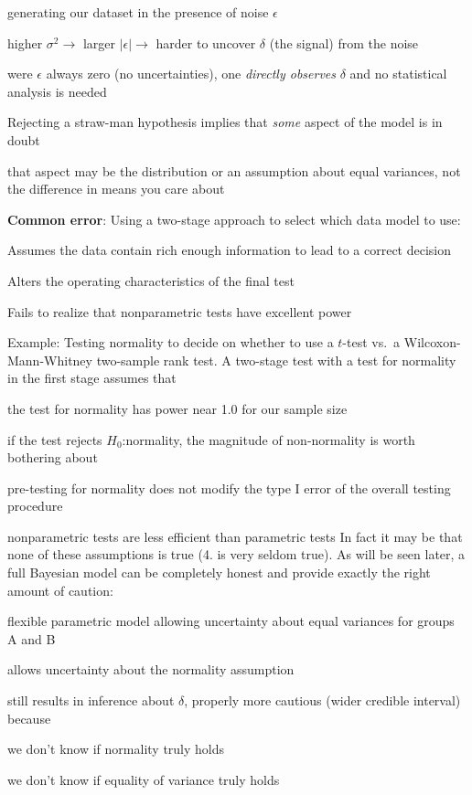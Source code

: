     generating our dataset in the presence of noise $\epsilon$
    \bi
    \item higher $\sigma^{2} \rightarrow$ larger $|\epsilon| \rightarrow$ harder
      to uncover $\delta$ (the signal) from the noise
    \item were $\epsilon$ always zero (no uncertainties), one
      \emph{directly observes} $\delta$ and no statistical analysis is needed
    \ei
  \ei
\item Rejecting a straw-man hypothesis implies that \emph{some} aspect of the
  model is in doubt
  \bi
  \item that aspect may be the distribution or an assumption about
    equal variances, not the difference in means you care about
  \ei
\ei

\textbf{Common error}: Using a two-stage approach to select which data
model to use:
\bi
\item Assumes the data contain rich enough information to lead to a
  correct decision
\item Alters the operating characteristics of the final test
\item Fails to realize that nonparametric tests have excellent power
\ei

Example: Testing normality to decide on whether to use a $t$-test
vs.\ a Wilcoxon-Mann-Whitney two-sample rank test.  A two-stage test
with a test for normality in the first stage assumes that
\be
\item the test for normality has power near 1.0 for our sample size
\item if the test rejects $H_{0}$:normality, the magnitude of
  non-normality is worth bothering about
\item pre-testing for normality does not modify the type I error of
  the overall testing procedure
\item nonparametric tests are less efficient than parametric tests
\ee
In fact it may be that none of these assumptions is true (4. is 
very seldom true).  As will be 
seen later, a full Bayesian model can be completely honest and provide
exactly the right amount of caution:
\bi
\item flexible parametric model allowing uncertainty about equal
  variances for groups A and B
\item allows uncertainty about the normality assumption
\item still results in inference about $\delta$, properly more
  cautious (wider credible interval) because
  \bi
  \item we don't know if normality truly holds
  \item we don't know if equality of variance truly holds
  \ei
\ei

